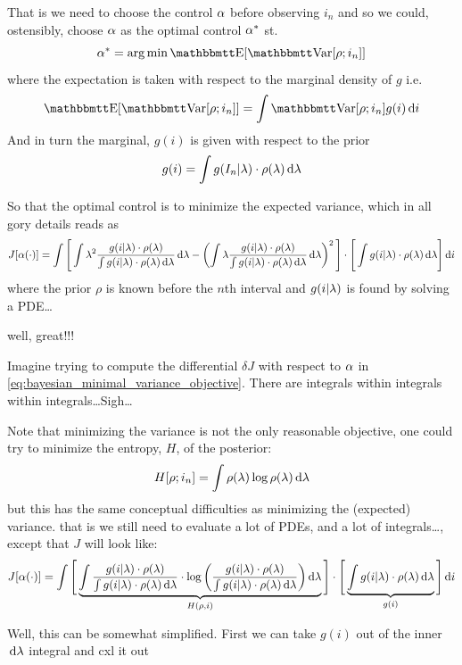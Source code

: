 \documentclass{article}
\begin{document}
That is we need to choose the control ${\alpha}$ before observing $i_n$ and so we
could, ostensibly, choose ${\alpha}$ as the optimal control ${\alpha}^*$ st.\ 
$$
\a^* = \argmin \Exp[\Var[\rho; i_n]]
$$
where the expectation is taken with respect to the marginal density of $g$
i.e.
$$
\Exp[\Var[\rho; i_n]] = \int \Var[\rho; i_n] g(i) \intd{i}
$$
And in turn the marginal, $g(i)$ is given with respect to the prior
$$ 
g(i) = \int g(I_n| {\lambda}) \cdot \rho({\lambda}) \, \mathrm{d} {\lambda}
$$

So that the optimal control is to minimize the expected variance, which in all
gory details reads as
\begin{equation}
J[{\alpha}(\cdot)] =
\int
 \Bigg[
\int {\lambda}^2 \frac{g(i| {\lambda}) \cdot \rho({\lambda})}
		{\int g(i| {\lambda}) \cdot \rho({\lambda}) \, \mathrm{d} {\lambda}} \, \mathrm{d} {\lambda} 
		- \left( \int {\lambda}  \frac{g(i| {\lambda}) \cdot \rho({\lambda})}
					  {\int g(i| {\lambda}) \cdot \rho({\lambda}) \, \mathrm{d} {\lambda}}\, \mathrm{d} {\lambda}\right)^2
					   \Bigg]
					  \cdot
					  \Bigg[
					    \int g(i| {\lambda}) \cdot \rho({\lambda}) \, \mathrm{d} {\lambda}
					  \Bigg]
					   \, \mathrm{d} i					   
\label{eq:bayesian_minimal_variance_objective}
\end{equation}
where the prior $\rho$ is known before the $n$th interval and $g(i| {\lambda})$ is found by solving a PDE\ldots 

well, great!!!

Imagine trying to compute the differential $\delta J$ with respect to
${\alpha}$ in \cref{eq:bayesian_minimal_variance_objective}. There are integrals
within integrals within integrals\ldots Sigh\ldots

Note that minimizing the variance is not the only reasonable objective, one
could try to minimize the entropy, $H$, of the posterior:
$$
H[\rho; i_n] = \int \rho({\lambda}) \log \rho({\lambda}) \, \mathrm{d} {\lambda}
$$
but this has the same conceptual difficulties as minimizing the (expected)
variance. that is we still need to evaluate a lot of PDEs, and a lot of
integrals\ldots, except that $J$ will look like:
\begin{equation}
J[{\alpha}(\cdot)] =
\int
 \Bigg[\underbrace{
\int \frac{g(i| {\lambda}) \cdot \rho({\lambda})}
		{\int g(i| {\lambda}) \cdot \rho({\lambda}) \, \mathrm{d} {\lambda}}
		\cdot \log\bigg( \frac{g(i| {\lambda}) \cdot \rho({\lambda})}
		{\int g(i| {\lambda}) \cdot \rho({\lambda}) \, \mathrm{d} {\lambda}} \bigg)
		 \, \mathrm{d} {\lambda}}_{H(\rho,i)}
			   \Bigg]
					  \cdot
					  \Bigg[
					  \underbrace{\int g(i| {\lambda}) \cdot \rho({\lambda}) \, \mathrm{d} {\lambda}}_{g(i)}
					  \Bigg]
					   \, \mathrm{d} i					   
\label{eq:bayesian_minimal_entropy_objective}
\end{equation}

Well, this can be somewhat simplified. First we can take $g(i)$ out of the inner
$\, \mathrm{d} {\lambda}$ integral and cxl it out
\end{document}
